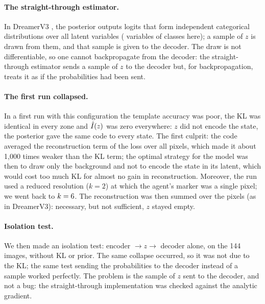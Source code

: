 \documentclass[10pt]{article}
\begin{document}
\paragraph{The straight-through estimator.}
In DreamerV3 , the posterior outputs logits that form independent categorical distributions over
all latent variables (\eThreeLatentVars{} variables of \eThreeLatentClasses{} classes here); a sample of $z$ is drawn
from them, and that sample is given to the decoder.
The draw is not differentiable, so one cannot backpropagate from the decoder: the straight-through estimator sends a
sample of $z$ to the decoder but, for backpropagation, treats it as if the probabilities had been sent.

\paragraph{The first run collapsed.}
In a first run with this configuration the template accuracy was poor, the KL was identical in every zone and $\hat{I}(z)$
was zero everywhere: $z$ did not encode the state, the posterior gave the same code to every state.
The first culprit: the code averaged the reconstruction term of the loss over all pixels, which made it about 1,000 %
times weaker than the KL term; the optimal strategy for the model was then to draw only the background and not to encode
the state in its latent, which would cost too much KL for almost no gain in reconstruction.
Moreover, the run used a reduced resolution ($k = 2$) at which the agent's marker was a single pixel; we went back to %
$k = 6$.
The reconstruction was then summed over the pixels (as in DreamerV3): necessary, but not sufficient, $z$ stayed empty.

\paragraph{Isolation test.}
We then made an isolation test: encoder $\to z \to$ decoder alone, on the 144 images, without KL or prior. %
The same collapse occurred, so it was not due to the KL; the same test sending the probabilities to the decoder
instead of a sample worked perfectly.
The problem is the sample of $z$ sent to the decoder, and not a bug: the straight-through implementation was checked
against the analytic gradient.
\end{document}
